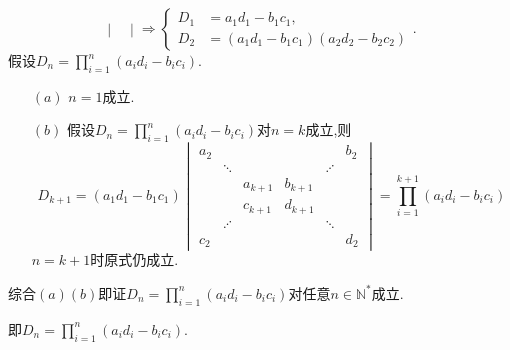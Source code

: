 \documentclass{article}
\begin{document}
\begin{enumerate}
\begin{enumerate}
\[\begin{vmatrix}
            \end{vmatrix}
            \Rightarrow
            \begin{cases}
                D_1&=a_1 d_1 - b_1 c_1,\\
                D_2&=(a_1 d_1 - b_1 c_1)(a_2 d_2 - b_2 c_2)       
           \end{cases}.
        \]
        假设$D_n=\prod\limits_{i=1}^{n}(a_i d_i - b_i c_i)$.
        \begin{enumerate}
            \item [$(a)$]$n=1$成立.
            \item [$(b)$]假设$D_n=\prod\limits_{i=1}^{n}(a_i d_i - b_i c_i)$对$n=k$成立,则
            \[
                D_{k+1}=(a_1 d_1 - b_1 c_1)
                \begin{vmatrix}
                    a_2 &         &         &         &         & b_2\\
                        & \ddots  &         &         & \iddots &    \\
                        &         & a_{k+1} & b_{k+1} &         &    \\
                        &         & c_{k+1} & d_{k+1} &         &    \\
                        & \iddots &         &         & \ddots  &    \\
                    c_2 &         &         &         &         & d_2
                \end{vmatrix}
                =\prod\limits_{i=1}^{k+1}(a_i d_i - b_i c_i)
            \]
            $n=k+1$时原式仍成立.
        \end{enumerate}
        综合$(a)(b)$即证$D_n=\prod\limits_{i=1}^{n}(a_i d_i - b_i c_i)$对任意$n\in \mathbb{N}^*$成立.
        
        即$D_n=\prod\limits_{i=1}^{n}(a_i d_i - b_i c_i)$.
    \end{enumerate}
\end{enumerate}
\end{document}
